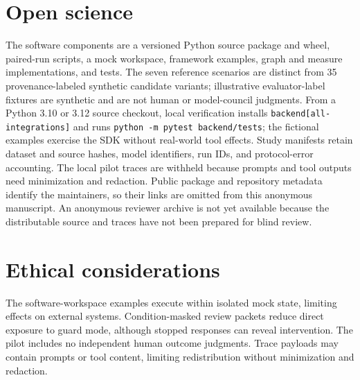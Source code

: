 \clearpage
\section{Open science}
\label{app:open-science}

The software components are a versioned Python source package and wheel, paired-run scripts, a mock workspace, framework examples, graph and measure implementations, and tests. The seven reference scenarios are distinct from 35 provenance-labeled synthetic candidate variants; illustrative evaluator-label fixtures are synthetic and are not human or model-council judgments. From a Python 3.10 or 3.12 source checkout, local verification installs \texttt{backend[all-integrations]} and runs \texttt{python -m pytest backend/tests}; the fictional examples exercise the SDK without real-world tool effects. Study manifests retain dataset and source hashes, model identifiers, run IDs, and protocol-error accounting. The local pilot traces are withheld because prompts and tool outputs need minimization and redaction. Public package and repository metadata identify the maintainers, so their links are omitted from this anonymous manuscript. An anonymous reviewer archive is not yet available because the distributable source and traces have not been prepared for blind review.

\section{Ethical considerations}
\label{app:ethics}

The software-workspace examples execute within isolated mock state, limiting effects on external systems. Condition-masked review packets reduce direct exposure to guard mode, although stopped responses can reveal intervention. The pilot includes no independent human outcome judgments. Trace payloads may contain prompts or tool content, limiting redistribution without minimization and redaction.


